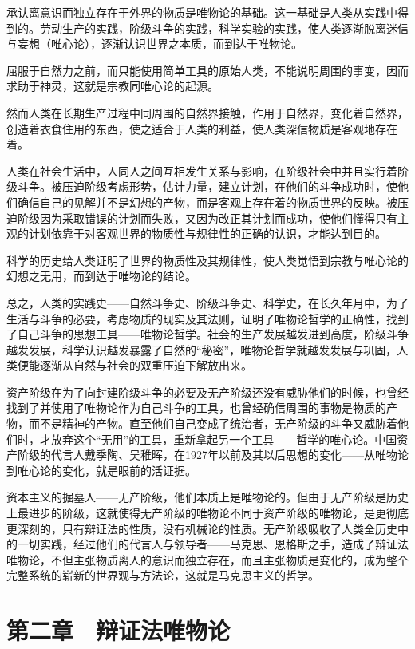 承认离意识而独立存在于外界的物质是唯物论的基础。这一基础是人类从实践中得到的。劳动生产的实践，阶级斗争的实践，科学实验的实践，使人类逐渐脱离迷信与妄想（唯心论），逐渐认识世界之本质，而到达于唯物论。

屈服于自然力之前，而只能使用简单工具的原始人类，不能说明周围的事变，因而求助于神灵，这就是宗教同唯心论的起源。

然而人类在长期生产过程中同周围的自然界接触，作用于自然界，变化着自然界，创造着衣食住用的东西，使之适合于人类的利益，使人类深信物质是客观地存在着。

人类在社会生活中，人同人之间互相发生关系与影响，在阶级社会中并且实行着阶级斗争。被压迫阶级考虑形势，估计力量，建立计划，在他们的斗争成功时，使他们确信自己的见解并不是幻想的产物，而是客观上存在着的物质世界的反映。被压迫阶级因为采取错误的计划而失败，又因为改正其计划而成功，使他们懂得只有主观的计划依靠于对客观世界的物质性与规律性的正确的认识，才能达到目的。

科学的历史给人类证明了世界的物质性及其规律性，使人类觉悟到宗教与唯心论的幻想之无用，而到达于唯物论的结论。

总之，人类的实践史——自然斗争史、阶级斗争史、科学史，在长久年月中，为了生活与斗争的必要，考虑物质的现实及其法则，证明了唯物论哲学的正确性，找到了自己斗争的思想工具——唯物论哲学。社会的生产发展越发进到高度，阶级斗争越发发展，科学认识越发暴露了自然的“秘密”，唯物论哲学就越发发展与巩固，人类便能逐渐从自然与社会的双重压迫下解放出来。

资产阶级在为了向封建阶级斗争的必要及无产阶级还没有威胁他们的时候，也曾经找到了并使用了唯物论作为自己斗争的工具，也曾经确信周围的事物是物质的产物，而不是精神的产物。直至他们自己变成了统治者，无产阶级的斗争又威胁着他们时，才放弃这个“无用”的工具，重新拿起另一个工具——哲学的唯心论。中国资产阶级的代言人戴季陶、吴稚晖，在1927年以前及其以后思想的变化——从唯物论到唯心论的变化，就是眼前的活证据。

资本主义的掘墓人——无产阶级，他们本质上是唯物论的。但由于无产阶级是历史上最进步的阶级，这就使得无产阶级的唯物论不同于资产阶级的唯物论，是更彻底更深刻的，只有辩证法的性质，没有机械论的性质。无产阶级吸收了人类全历史中的一切实践，经过他们的代言人与领导者——马克思、恩格斯之手，造成了辩证法唯物论，不但主张物质离人的意识而独立存在，而且主张物质是变化的，成为整个完整系统的崭新的世界观与方法论，这就是马克思主义的哲学。

\section{第二章　辩证法唯物论}

